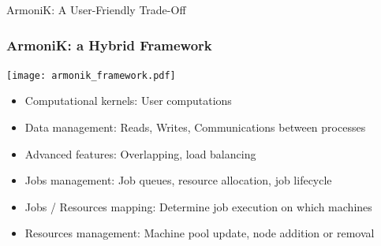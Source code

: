 \documentclass[10pt,aspectratio=1609]{beamer}
\begin{document}
\begin{section}{ArmoniK: A User-Friendly Trade-Off}

 \begin{frame}
   \frametitle{ArmoniK: a Hybrid Framework}
   \texttt{[image: armonik\_framework.pdf]}
   \begin{itemize}
     \item Computational kernels: User computations
     \item Data management: Reads, Writes, Communications between processes
     \item Advanced features: Overlapping, load balancing
     \item Jobs management: Job queues, resource allocation, job lifecycle
     \item Jobs / Resources mapping: Determine job execution on which machines
     \item Resources management: Machine pool update, node addition or removal
   \end{itemize}
 \end{frame}



\end{section}
\end{document}
